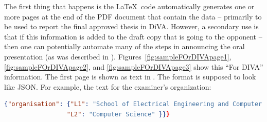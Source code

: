The first thing that happens is the \LaTeX~code automatically generates one or more pages at the end of the PDF document that contain the data – primarily to be used to report the final approved thesis in DiVA. However, a secondary use is that if this information is added to the draft copy that is going to the opponent – then one can potentially automate many of the steps in announcing the oral presentation (as was described in ).
Figures~\ref{fig:sampleFOrDIVApage1}, \ref{fig:sampleFOrDIVApage2}, and \ref{fig:sampleFOrDIVApage3} show this “For DIVA” information. The first page is shown as text in . The format is supposed to look like JSON.
For example, the text for the examiner's organization:
\begin{lstlisting}[language=json]
{"organisation": {"L1": "School of Electrical Engineering and Computer Science ",
                 "L2": "Computer Science" }}}
\end{lstlisting}

